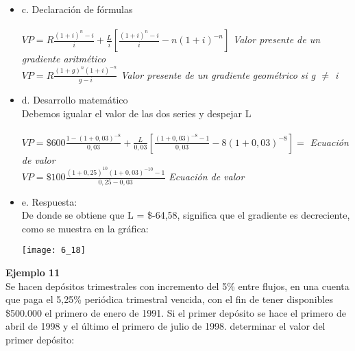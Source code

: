 \begin{itemize}
		\item c. Declaración de fórmulas\\
		\\$VP=R\frac{(1+i)^n-i}{i}+\frac{L}{i}[\frac{(1+i)^n-i}{i}-n(1+i)^{-n}]$\hspace{20 pt} \textit{Valor presente de un gradiente aritmético}\\
		$VP = R\frac{(1+g)^n(1+i)^{-n}}{g-i}$ \hspace{35 pt} \textit{Valor presente de un gradiente geométrico si g $\not=$ i}\\
		\item d. Desarrollo matemático\\
		Debemos igualar el valor de las dos series y despejar L\\
		\\$VP = \$600\frac{1-(1+0,03)^{-8}}{0,03} + \frac{L}{0,03}[\frac{(1+0,03)^{-8}-1}{0,03}-8(1+0,03)^{-8}] = $ \hspace{35 pt} \textit{Ecuación de valor}\\
		$VP = \$100\frac{(1+0,25)^{10}(1+0,03)^{-10}-1}{0,25-0,03}$ \hspace{35 pt} \textit{Ecuación de valor}\\
		\item e. Respuesta:\\
		De donde se obtiene que L = \$-64,58, significa que el gradiente es decreciente, como se muestra en la gráfica:\\
		\begin{center}
			\texttt{[image: 6\_18]}
		\end{center}
	\end{itemize}
	
	\textbf{Ejemplo 11}\\
	Se hacen depósitos trimestrales con incremento del 5\% entre flujos, en una cuenta que paga el 5,25\% periódica trimestral vencida, con el fin de tener disponibles \$500.000 el primero de enero de 1991. Si el primer depósito se hace el primero de abril de 1998 y el último el primero de julio de 1998. determinar el valor del primer depósito:\\
	
